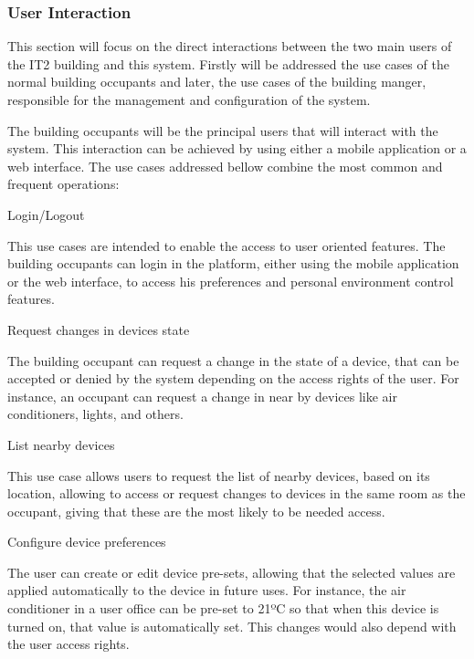 \subsubsection{User Interaction}
\label{Use:users}

This section will focus on the direct interactions between the two main users of the IT2 building and this system. Firstly will be addressed the use cases of the normal building occupants and later, the use cases of the building manger, responsible for the management and configuration of the system.


The building occupants will be the principal users that will interact with the system. This interaction can be achieved by using either a mobile application or a web interface. The use cases addressed bellow combine the most common and frequent operations:

\begin{Paragraph}{Login/Logout}

This use cases are intended to enable the access to user oriented features. The building occupants can login in the platform, either using the mobile application or the web interface, to access his preferences and personal environment control features. 

\end{Paragraph}

\begin{Paragraph}{Request changes in devices state}

The building occupant can request a change in the state of a device, that can be accepted or denied by the system depending on the access rights of the user. For instance, an occupant can request a change in near by devices like  air conditioners, lights, and others.

\end{Paragraph}

\begin{Paragraph}{List nearby devices}

This use case allows users to request the list of nearby devices, based on its location, allowing to access or request changes to devices in the same room as the occupant, giving that these are the most likely to be needed access.

\end{Paragraph}

\begin{Paragraph}{Configure device preferences}

The user can create or edit device pre-sets, allowing that the selected values are applied automatically to the device in future uses. For instance, the air conditioner in a user office can be pre-set to 21ºC so that when this device is turned on, that value is automatically set. This changes would also depend with the user access rights.

\end{Paragraph}

